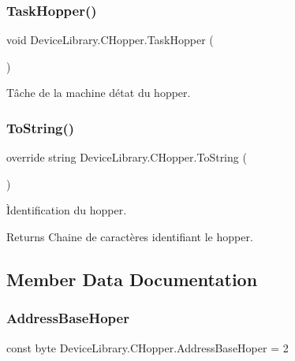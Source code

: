 \subsubsection{\texorpdfstring{Task\+Hopper()}{TaskHopper()}}
{\footnotesize\ttfamily void Device\+Library.\+C\+Hopper.\+Task\+Hopper (\begin{DoxyParamCaption}{ }\end{DoxyParamCaption})\hspace{0.3cm}{\ttfamily [inline]}}



Tâche de la machine d\textquotesingle{}état du hopper. 

\mbox{\label{class_device_library_1_1_c_hopper_a25b43f1aafc2b92432077743ce07b39c}} 
\subsubsection{\texorpdfstring{To\+String()}{ToString()}}
{\footnotesize\ttfamily override string Device\+Library.\+C\+Hopper.\+To\+String (\begin{DoxyParamCaption}{ }\end{DoxyParamCaption})\hspace{0.3cm}{\ttfamily [inline]}}



Ìdentification du hopper. 

\begin{DoxyReturn}{Returns}
Chaine de caractères identifiant le hopper.
\end{DoxyReturn}


\subsection{Member Data Documentation}
\mbox{\label{class_device_library_1_1_c_hopper_a8d069f368b3dd2356d76b8244181168b}} 
\subsubsection{\texorpdfstring{Address\+Base\+Hoper}{AddressBaseHoper}}
{\footnotesize\ttfamily const byte Device\+Library.\+C\+Hopper.\+Address\+Base\+Hoper = 2}



